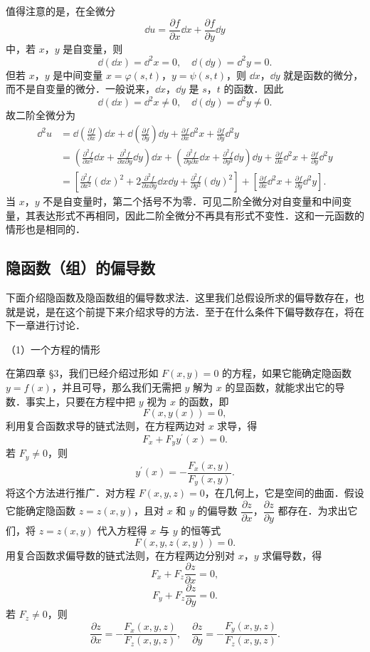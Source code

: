 值得注意的是，在全微分
\[
\dd u=\frac{\partial f}{\partial x}\dd x+\frac{\partial f}{\partial y}\dd y
\]
中，若 $x$，$y$ 是自变量，则
\[
\dd(\dd x)=\dd^{2}x=0,\quad \dd(\dd y)=\dd^{2}y=0.
\]
但若 $x$，$y$ 是中间变量 $x=\varphi(s,t)$，$y=\psi(s,t)$，则 $\dd x$，$\dd y$ 就是函数的微分，而不是自变量的微分．一般说来，$\dd x$，$\dd y$ 是 $s$，$t$ 的函数．因此
\[
\dd(\dd x)=\dd^{2}x\neq 0,\quad \dd(\dd y)=\dd^{2}y\neq 0.
\]
故二阶全微分为
\[
\begin{aligned}
\dd^{2}u&=\dd\left(\frac{\partial f}{\partial x}\right)\dd x+\dd\left(\frac{\partial f}{\partial y}\right)\dd y+\frac{\partial f}{\partial x}\dd^{2}x+\frac{\partial f}{\partial y}\dd^{2}y\\
&=\left(\frac{\partial^{2}f}{\partial x^{2}}\dd x+\frac{\partial^{2}f}{\partial x\partial y}\dd y\right)\dd x+\left(\frac{\partial^{2}f}{\partial y\partial x}\dd x+\frac{\partial^{2}f}{\partial y^{2}}\dd y\right)\dd y+\frac{\partial f}{\partial x}\dd^{2}x+\frac{\partial f}{\partial y}\dd^{2}y\\
&=\left[\frac{\partial^{2}f}{\partial x^{2}}(\dd x)^{2}+2\frac{\partial^{2}f}{\partial x\partial y}\dd x\dd y+\frac{\partial^{2}f}{\partial y^{2}}(\dd y)^{2}\right]+\left[\frac{\partial f}{\partial x}\dd^{2}x+\frac{\partial f}{\partial y}\dd^{2}y\right].
\end{aligned}
\]
当 $x$，$y$ 不是自变量时，第二个括号不为零．可见二阶全微分对自变量和中间变量，其表达形式不再相同，因此二阶全微分不再具有形式不变性．这和一元函数的情形也是相同的．

\subsection{隐函数（组）的偏导数}

下面介绍隐函数及隐函数组的偏导数求法．这里我们总假设所求的偏导数存在，也就是说，是在这个前提下来介绍求导的方法．至于在什么条件下偏导数存在，将在下一章进行讨论．

（1）一个方程的情形

在第四章 §3，我们已经介绍过形如 $F(x,y)=0$ 的方程，如果它能确定隐函数 $y=f(x)$，并且可导，那么我们无需把 $y$ 解为 $x$ 的显函数，就能求出它的导数．事实上，只要在方程中把 $y$ 视为 $x$ 的函数，即
\[
F(x,y(x))=0,
\]
利用复合函数求导的链式法则，在方程两边对 $x$ 求导，得
\[
F_{x}+F_{y}y^{\prime}(x)=0.
\]
若 $F_{y}\neq 0$，则
\[
y^{\prime}(x)=-\frac{F_{x}(x,y)}{F_{y}(x,y)}.
\]
将这个方法进行推广．对方程 $F(x,y,z)=0$，在几何上，它是空间的曲面．假设它能确定隐函数 $z=z(x,y)$，且对 $x$ 和 $y$ 的偏导数 $\dfrac{\partial z}{\partial x}$，$\dfrac{\partial z}{\partial y}$ 都存在．为求出它们，将 $z=z(x,y)$ 代入方程得 $x$ 与 $y$ 的恒等式
\[
F(x,y,z(x,y))=0.
\]
用复合函数求偏导数的链式法则，在方程两边分别对 $x$，$y$ 求偏导数，得
\[
F_{x}+F_{z}\frac{\partial z}{\partial x}=0,
\]
\[
F_{y}+F_{z}\frac{\partial z}{\partial y}=0.
\]
若 $F_{z}\neq 0$，则
\[
\frac{\partial z}{\partial x}=-\frac{F_{x}(x,y,z)}{F_{z}(x,y,z)},\quad \frac{\partial z}{\partial y}=-\frac{F_{y}(x,y,z)}{F_{z}(x,y,z)}.
\]

